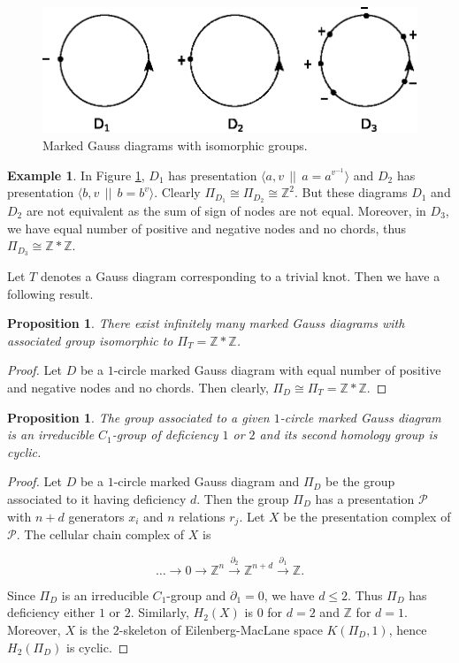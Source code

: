 \documentclass[11 pt, reqno]{amsart}
\newtheorem{proposition}[theorem]{Proposition}
\theoremstyle{definition}
\newtheorem{example}[theorem]{Example}
\numberwithin{equation}{subsection}
\begin{document}
\begin{figure}[H]
\includegraphics{nodes-1.eps}
\caption{Marked Gauss diagrams with isomorphic groups.}
\label{fig:general-Gauss-diagrams-with-isomorphic-group}
\end{figure}

\begin{example}
In Figure \ref{fig:general-Gauss-diagrams-with-isomorphic-group}, $D_1$ has presentation $\langle a,v ~~||~~a=a^{v^{-1}} \rangle$
and $D_2$ has presentation $\langle b,v ~~||~~b=b^{v} \rangle$. Clearly $\Pi_{D_1} \cong \Pi_{D_2} \cong \mathbb{Z}^2.$ But these diagrams $D_1$ and $D_2$ are not equivalent as the sum of sign of nodes are not equal. Moreover, in $D_3$, we have equal number of positive and negative nodes and no chords, thus $\Pi_{D_3} \cong \mathbb{Z}*\mathbb{Z}$.
\end{example}

Let $T$ denotes a Gauss diagram corresponding to a trivial knot. Then we have a following result.

\begin{proposition}
There exist infinitely many marked Gauss diagrams with associated group isomorphic to $\Pi_T = \mathbb{Z}* \mathbb{Z}$.
\end{proposition}
\begin{proof}
Let $D$ be a $1$-circle marked Gauss diagram with equal number of positive and negative nodes and no chords. Then clearly, $\Pi_D \cong \Pi_T = \mathbb{Z} * \mathbb{Z}$. 
\end{proof}

\begin{proposition}
The group associated to a given $1$-circle marked Gauss diagram is an irreducible $C_1$-group of deficiency $1$ or $2$ and its second homology group is cyclic.
\end{proposition}




\begin{proof}
Let $D$ be a $1$-circle marked Gauss diagram and $\Pi_D$ be the group associated to it having deficiency $d$. Then the group $\Pi_D$ has a presentation $\mathcal{P}$ with $n+d$ generators $x_i$ and $n$ relations $r_j$. Let $X$ be the presentation complex of $\mathcal{P}$. The cellular chain complex of $X$ is

$$\ldots\to 0\to \mathbb{Z} ^n \stackrel{\partial_2}{\to} \mathbb{Z}^{n+d}
\stackrel{\partial_1}{\to}\mathbb{Z}.$$

Since $\Pi_D$ is an irreducible $C_1$-group and $\partial_1=0$, we have $d \leq 2$. Thus $\Pi_D$ has deficiency either $1$ or $2$.
Similarly, $H_2(X)$ is $0$ for $d=2$ and $\mathbb{Z}$ for $d=1$. Moreover, $X$ is the $2$-skeleton of Eilenberg-MacLane space $K(\Pi_D,1)$, hence $H_2(\Pi_D)$ is cyclic.
\end{proof}
\end{document}
